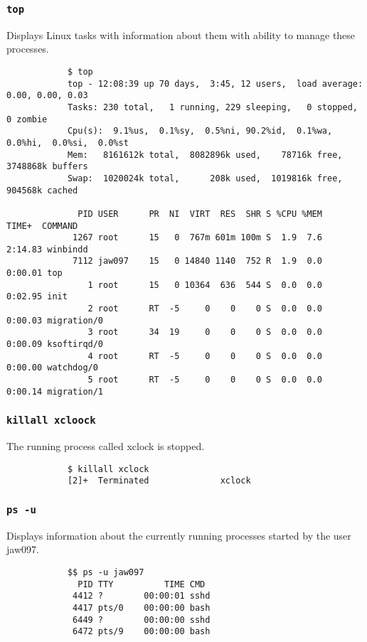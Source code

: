 \documentclass[11pt]{article} %
\newcommand{\code}[1]{\texttt{#1}}
\begin{document}
	\subsubsection{\code{top}}
	Displays Linux tasks with information about them with ability to manage
	these processes.
		\begin{verbatim}
			$ top
			top - 12:08:39 up 70 days,  3:45, 12 users,  load average: 0.00, 0.00, 0.03
			Tasks: 230 total,   1 running, 229 sleeping,   0 stopped,   0 zombie
			Cpu(s):  9.1%us,  0.1%sy,  0.5%ni, 90.2%id,  0.1%wa,  0.0%hi,  0.0%si,  0.0%st
			Mem:   8161612k total,  8082896k used,    78716k free,  3748868k buffers
			Swap:  1020024k total,      208k used,  1019816k free,   904568k cached

			  PID USER      PR  NI  VIRT  RES  SHR S %CPU %MEM    TIME+  COMMAND
			 1267 root      15   0  767m 601m 100m S  1.9  7.6   2:14.83 winbindd
			 7112 jaw097    15   0 14840 1140  752 R  1.9  0.0   0:00.01 top
			    1 root      15   0 10364  636  544 S  0.0  0.0   0:02.95 init
			    2 root      RT  -5     0    0    0 S  0.0  0.0   0:00.03 migration/0
			    3 root      34  19     0    0    0 S  0.0  0.0   0:00.09 ksoftirqd/0
			    4 root      RT  -5     0    0    0 S  0.0  0.0   0:00.00 watchdog/0
			    5 root      RT  -5     0    0    0 S  0.0  0.0   0:00.14 migration/1
		\end{verbatim}

	\subsubsection{\code{killall xcloock}}
	The running process called xclock is stopped.
		\begin{verbatim}
			$ killall xclock
			[2]+  Terminated              xclock
		\end{verbatim}

	\subsubsection{\code{ps -u}}
	Displays information about the currently running processes started by the user jaw097.
		\begin{verbatim}
			$$ ps -u jaw097
			  PID TTY          TIME CMD
			 4412 ?        00:00:01 sshd
			 4417 pts/0    00:00:00 bash
			 6449 ?        00:00:00 sshd
			 6472 pts/9    00:00:00 bash
		\end{verbatim}

	\newpage
\end{document}
